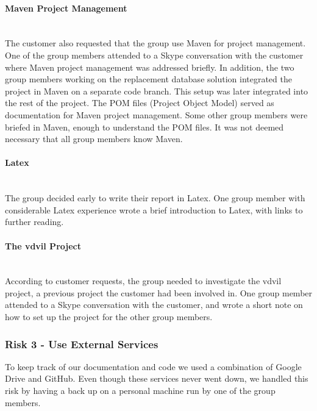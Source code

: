 \documentclass[../document]{subfiles}
\begin{document}
\paragraph{Maven Project Management} \ \\
The customer also requested that the group use Maven for project management. One of the group members attended to a Skype conversation with the customer where Maven project management was addressed briefly. In addition, the two group members working on the replacement database solution integrated the project in Maven on a separate code branch. This setup was later integrated into the rest of the project. The POM files (Project Object Model) served as documentation for Maven project management. Some other group members were briefed in Maven, enough to understand the POM files. It was not deemed necessary that all group members know Maven.

\paragraph{Latex} \ \\
The group decided early to write their report in Latex. One group member with considerable Latex experience wrote a brief introduction to Latex, with links to further reading.

\paragraph{The vdvil Project} \ \\
According to customer requests, the group needed to investigate the vdvil project, a previous project the customer had been involved in. One group member attended to a Skype conversation with the customer, and wrote a short note on how to set up the project for the other group members.


\subsubsection{Risk 3 - Use External Services}
To keep track of our documentation and code we used a combination of Google Drive and GitHub. Even though these services never went down, we handled this risk by having a back up on a personal machine run by one of the group members. 
\end{document}
